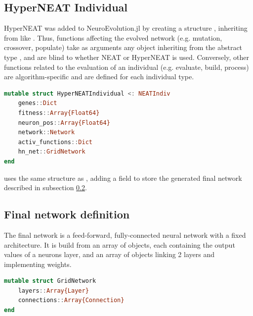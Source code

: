 \subsection{HyperNEAT Individual}

HyperNEAT was added to NeuroEvolution.jl by creating a structure , inheriting from  like . Thus, functions affecting the evolved network (e.g. mutation, crossover, populate) take as arguments any object inheriting from the abstract type , and are blind to whether NEAT or HyperNEAT is used. Conversely, other functions related to the evaluation of an individual (e.g. evaluate, build, process) are algorithm-specific and are defined for each individual type.

\begin{minipage}{\linewidth}
\begin{lstlisting}[language=Julia, caption=HyperNEAT Individual (\href{https://github.com/TemplierPaul/NeuroEvolution.jl/blob/master/src/HyperNEAT.jl}{\color{blue}{Source}})]
mutable struct HyperNEATIndividual <: NEATIndiv
    genes::Dict
    fitness::Array{Float64}
    neuron_pos::Array{Float64}
    network::Network
    activ_functions::Dict
    hn_net::GridNetwork
end
\end{lstlisting}
\end{minipage}

 uses the same structure as , adding a  field to store the generated final network described in subsection \ref{sub:final-hn-net}.

\subsection{Final network definition}
\label{sub:final-hn-net}
The final network is a feed-forward, fully-connected neural network with a fixed architecture. It is build from an array of  objects, each containing the output values of a neurons layer, and an array of  objects linking 2 layers and implementing weights. 

\begin{minipage}{\linewidth}
\begin{lstlisting}[language=Julia, caption=HyperNEAT final network (\href{https://github.com/TemplierPaul/NeuroEvolution.jl/blob/master/src/HyperNEAT.jl}{\color{blue}{Source}})]
mutable struct GridNetwork
    layers::Array{Layer}
    connections::Array{Connection}
end
\end{lstlisting}
\end{minipage}

